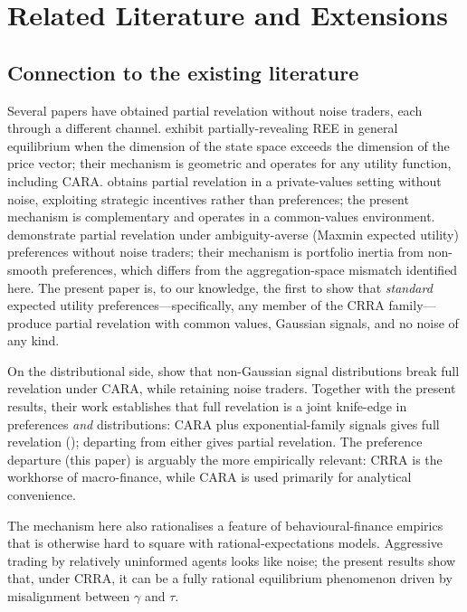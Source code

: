 \documentclass[12pt,letterpaper]{article}
\theoremstyle{definition}
\theoremstyle{remark}
\newcommand{\1}{\mathbf{1}}
\begin{document}
\section{Related Literature and Extensions}\label{sec:literature}

\subsection{Connection to the existing literature}

Several papers have obtained partial revelation without noise traders,
each through a different channel. \citet{HeifetzPolemarchakis1998} exhibit
partially-revealing REE in general equilibrium when the dimension of
the state space exceeds the dimension of the price vector; their mechanism
is geometric and operates for any utility function, including CARA.
\citet{Vives2011} obtains partial revelation in a private-values setting
without noise, exploiting strategic incentives rather than preferences;
the present mechanism is complementary and operates in a common-values
environment. \citet{CondieGanguli2011} demonstrate partial revelation
under ambiguity-averse (Maxmin expected utility) preferences without
noise traders; their mechanism is portfolio inertia from non-smooth
preferences, which differs from the aggregation-space mismatch identified
here. The present paper is, to our knowledge, the first to show that
\emph{standard} expected utility preferences---specifically, any member
of the CRRA family---produce partial revelation with common values,
Gaussian signals, and no noise of any kind.

On the distributional side, \citet{AlbagliHellwigTsyvinski2024} show
that non-Gaussian signal distributions break full revelation under CARA,
while retaining noise traders. Together with the present results, their
work establishes that full revelation is a joint knife-edge in preferences
\emph{and} distributions: CARA plus exponential-family signals gives full
revelation (\citealt{BreonDrish2015}); departing from either gives partial
revelation. The preference departure (this paper) is arguably the more
empirically relevant: CRRA is the workhorse of macro-finance, while CARA
is used primarily for analytical convenience.

The mechanism here also rationalises a feature of behavioural-finance
empirics that is otherwise hard to square with rational-expectations
models. Aggressive trading by relatively uninformed agents looks like
noise; the present results show that, under CRRA, it can be a fully
rational equilibrium phenomenon driven by misalignment between $\gamma$
and $\tau$.
\end{document}
